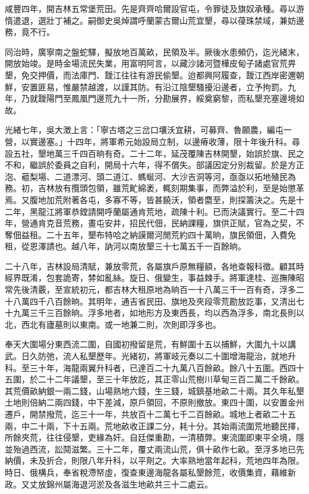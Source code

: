 \begin{pinyinscope}
咸豐四年，開吉林五常堡荒田。先是齊齊哈爾設官屯，令罪徒及旗奴承種。尋以游惰遣退，選壯丁補之。嗣御史吳焯謂呼蘭蒙古爾山荒宜墾，尋以葠珠禁域，兼妨邊務，竟不行。

同治時，廣寧南之盤蛇驛，擬放地百萬畝，民領及半。厥後水患頻仍，迄光緒末，開放始竣。是時金場流民失業，用富明阿言，以藏沙諸河暨樺皮甸子諸處官荒畀墾，免交押價，而法庫門、靉江往往有游民偷墾。迨都興阿履查，靉江西岸密邇朝鮮，安置匪易，惟嚴禁越渡，以謹其防。有沿江陰墾騷擾沿邊者，立予拘罰。九年，乃就靉陽門至鳳凰門邊荒九十一所，分勘展界，綏奠窮黎，而私墾充塞邊境如故。

光緒七年，吳大澂上言：「寧古塔之三岔口壤沃宜耕，可募齊、魯願農，編屯一營，以實邊塞。」十四年，將軍希元始設局立制，以邊瘠收薄，限十年後升科。尋設五社，墾地萬三千四百晌有奇。二十二年，延茂覆陳吉林開墾，始誤於旗、民之不和，繼誤於委員之自利，開局十六年，得不償失。部議因定分別裁留。於是方正泡、藲梨場、二道漂河、頭二道江、螞蜒河、大沙吉洞等河，亟亟以拓地殖民為務。初，吉林放有攬頭包領，雖荒甿綿袤，輒刻期集事，而弊溢於利，至是始懲革焉。又腹地加荒附著各屯，多寡不等，皆甚饒沃，領者麕至，則探籌決之。先是十二年，黑龍江將軍恭鏜請開呼蘭屬通肯荒地，疏陳十利。已而決議實行。至二十四年，營通肯克音荒務，畫屯安井，招民代佃，民納課糧，旗供正賦，官為之契，不奪佃益租。二十五年，墾布特哈之納謨爾河閒荒約四十萬晌，旗民領佃，入費免租，從恩澤請也。越八年，訥河以南放墾三十七萬五千一百餘晌。

二十八年，吉林設局清賦，兼放零荒，各屬旗戶原無糧額，各地查報科徵。顧其時經界既淆，包套詭寄，棼如亂絲。旋日、俄變生，事益棘手。將軍達桂、巡撫陳昭常先後清覈，至宣統初元，都吉林大租原地為晌百一十八萬三千一百有奇，浮多二十八萬四千八百餘晌。其明年，通吉省民田、旗地及夾段零荒勘放訖事，又清出七十九萬三千三百餘晌。浮多地者，如地形方及東西長，均以西為浮多，南北長則以北，西北有廬墓則以東南。或一地兼二則，次則即浮多也。

奉天大圍場分東西流二圍，自國初撥留是荒，有鮮圍十五以捕鮮，大圍九十以講武。日久防弛，流人私墾歷年。光緒初，將軍岐元奏以二十圍增海龍治，就地升科。至三十年，海龍兩翼升科者，已達百二十九萬八百餘畝。餘八十五圍。西四十五圍，於二十二年議墾，至三十年放訖，其正零山荒樹川草甸三百二萬二千餘畝。其荒價畝納銀一兩二錢，山場熟地六錢，生三錢，城鎮基地畝二十兩。其久年私墾土地則倍納二兩四錢，中下差減，原戶領回，不原則撤放。東四十圍，以安置金州遷戶，開禁撥荒，迄三十一年，共放百十二萬七千二百餘畝。城地上者畝二十五兩，中二十兩，下十五兩。荒地畝收正課二分，耗十分。其始兩流圍荒地聽民擇，所餘夾荒，往往侵墾，吏緣為奸。自廷傑重勘，一清積弊。東流圍即東平全境，隱並殆過西流，訟鬩滋繁。三十二年，覆丈兩流山荒，俱十畝作七畝。至浮多地已先納價，未及折合，則限八年升科，以平劑之。大率熟地當年起科，荒地四年為限。時日、俄構兵，奉省稅滯帑虛，復查東邊海龍各屬私墾餘荒，收價集資，藉維新政。又丈放錦州屬海退河淤及各滋生地畝共三十二處云。


\end{pinyinscope}
